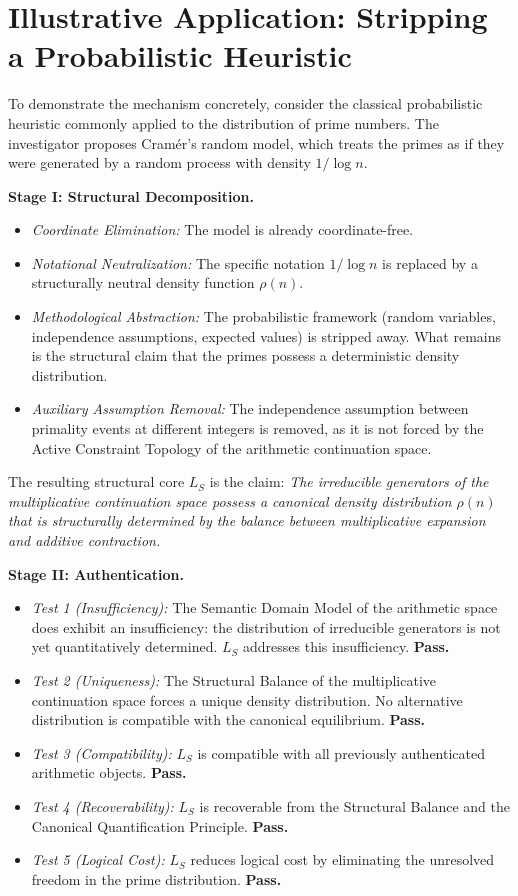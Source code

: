 \documentclass[12pt,openany]{extbook}
\theoremstyle{plain}
\theoremstyle{definition}
\begin{document}
\section{Illustrative Application: Stripping a Probabilistic Heuristic}

To demonstrate the mechanism concretely, consider the classical probabilistic heuristic commonly applied to the distribution of prime numbers. The investigator proposes Cram\'{e}r's random model, which treats the primes as if they were generated by a random process with density $1/\log n$.

\textbf{Stage I: Structural Decomposition.}
\begin{itemize}
    \item \emph{Coordinate Elimination:} The model is already coordinate-free.
    \item \emph{Notational Neutralization:} The specific notation $1/\log n$ is replaced by a structurally neutral density function $\rho(n)$.
    \item \emph{Methodological Abstraction:} The probabilistic framework (random variables, independence assumptions, expected values) is stripped away. What remains is the structural claim that the primes possess a deterministic density distribution.
    \item \emph{Auxiliary Assumption Removal:} The independence assumption between primality events at different integers is removed, as it is not forced by the Active Constraint Topology of the arithmetic continuation space.
\end{itemize}
The resulting structural core $L_S$ is the claim: \emph{The irreducible generators of the multiplicative continuation space possess a canonical density distribution $\rho(n)$ that is structurally determined by the balance between multiplicative expansion and additive contraction.}

\textbf{Stage II: Authentication.}
\begin{itemize}
    \item \emph{Test 1 (Insufficiency):} The Semantic Domain Model of the arithmetic space does exhibit an insufficiency: the distribution of irreducible generators is not yet quantitatively determined. $L_S$ addresses this insufficiency. \textbf{Pass.}
    \item \emph{Test 2 (Uniqueness):} The Structural Balance of the multiplicative continuation space forces a unique density distribution. No alternative distribution is compatible with the canonical equilibrium. \textbf{Pass.}
    \item \emph{Test 3 (Compatibility):} $L_S$ is compatible with all previously authenticated arithmetic objects. \textbf{Pass.}
    \item \emph{Test 4 (Recoverability):} $L_S$ is recoverable from the Structural Balance and the Canonical Quantification Principle. \textbf{Pass.}
    \item \emph{Test 5 (Logical Cost):} $L_S$ reduces logical cost by eliminating the unresolved freedom in the prime distribution. \textbf{Pass.}
\end{itemize}
\end{document}
